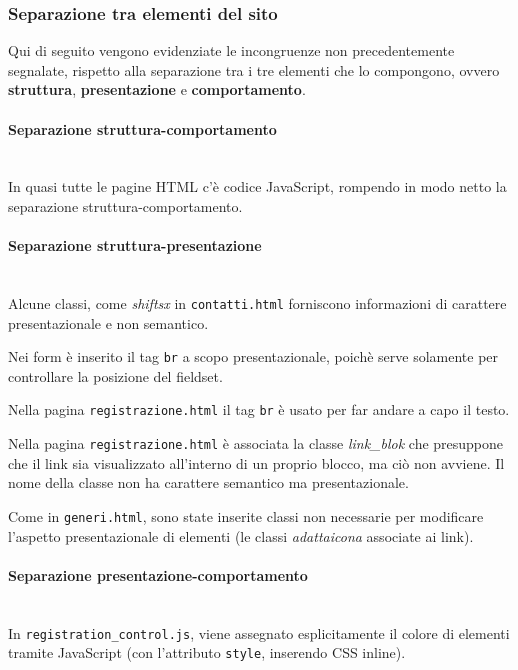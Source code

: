 \subsubsection{Separazione tra elementi del sito}
Qui di seguito vengono evidenziate le incongruenze non precedentemente
segnalate, rispetto alla separazione tra i tre elementi che lo compongono,
ovvero \textbf{struttura}, \textbf{presentazione} e \textbf{comportamento}.

\paragraph{Separazione struttura-comportamento} ~\\
In quasi tutte le pagine HTML c'è codice JavaScript, rompendo in modo netto la
separazione struttura-comportamento.

\paragraph{Separazione struttura-presentazione} ~\\
Alcune classi, come \textit{shiftsx} in \texttt{contatti.html} forniscono
informazioni di carattere presentazionale e non semantico.

Nei form è inserito il tag \texttt{br} a scopo presentazionale, poichè serve
solamente per controllare la posizione del fieldset.

Nella pagina \texttt{registrazione.html} il tag \texttt{br} è usato per far
andare a capo il testo.

Nella pagina \texttt{registrazione.html} è associata la classe
\textit{link\_blok} che presuppone che il link sia visualizzato all'interno di
un proprio blocco, ma ciò non avviene. Il nome della classe non ha carattere
semantico ma presentazionale.

Come in \texttt{generi.html}, sono state inserite classi non necessarie per
modificare l'aspetto presentazionale di elementi (le classi
\textit{adattaicona} associate ai link).

\paragraph{Separazione presentazione-comportamento} ~\\
In \texttt{registration\_control.js}, viene assegnato esplicitamente il colore
di elementi tramite JavaScript (con l'attributo \texttt{style}, inserendo CSS
inline).

